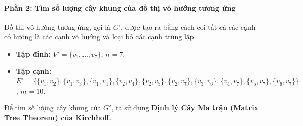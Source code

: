 \documentclass[a4paper,12pt]{article}
\begin{document}
\paragraph{Phần 2: Tìm số lượng cây khung của đồ thị vô hướng tương ứng}
Đồ thị vô hướng tương ứng, gọi là $G'$, được tạo ra bằng cách coi tất cả các cạnh có hướng là các cạnh vô hướng và loại bỏ các cạnh trùng lặp.
\begin{itemize}
    \item \textbf{Tập đỉnh:} $V' = \{v_1, \dots, v_7\}$, $n=7$.
    \item \textbf{Tập cạnh:} $E' = \{ \{v_1,v_2\}, \{v_1,v_3\}, \{v_1,v_4\}, \{v_2,v_4\}, \{v_2,v_5\}, \{v_2,v_7\}, \{v_3,v_6\}, \{v_4,v_7\}, \{v_5,v_7\}, \{v_6,v_7\} \}$, $m=10$.
\end{itemize}
Để tìm số lượng cây khung của $G'$, ta sử dụng \textbf{Định lý Cây Ma trận (Matrix Tree Theorem) của Kirchhoff}.
\end{document}
